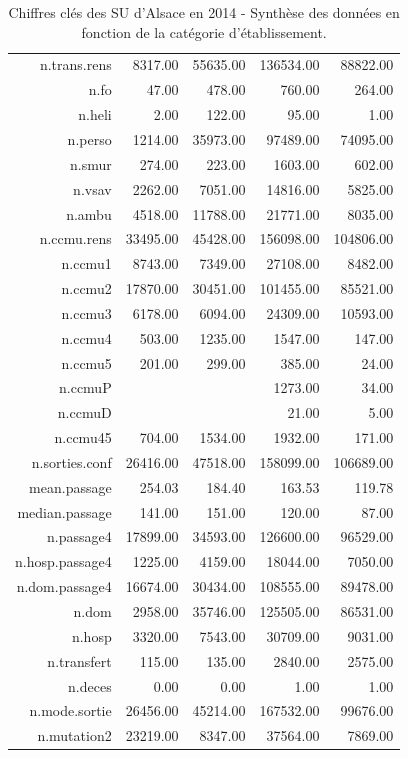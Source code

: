 \documentclass[]{article}
\begin{document}
\begin{table}[ht]
\begin{tabular}{rrrrr}
  n.trans.rens & 8317.00 & 55635.00 & 136534.00 & 88822.00 \\ 
  n.fo & 47.00 & 478.00 & 760.00 & 264.00 \\ 
  n.heli & 2.00 & 122.00 & 95.00 & 1.00 \\ 
  n.perso & 1214.00 & 35973.00 & 97489.00 & 74095.00 \\ 
  n.smur & 274.00 & 223.00 & 1603.00 & 602.00 \\ 
  n.vsav & 2262.00 & 7051.00 & 14816.00 & 5825.00 \\ 
  n.ambu & 4518.00 & 11788.00 & 21771.00 & 8035.00 \\ 
  n.ccmu.rens & 33495.00 & 45428.00 & 156098.00 & 104806.00 \\ 
  n.ccmu1 & 8743.00 & 7349.00 & 27108.00 & 8482.00 \\ 
  n.ccmu2 & 17870.00 & 30451.00 & 101455.00 & 85521.00 \\ 
  n.ccmu3 & 6178.00 & 6094.00 & 24309.00 & 10593.00 \\ 
  n.ccmu4 & 503.00 & 1235.00 & 1547.00 & 147.00 \\ 
  n.ccmu5 & 201.00 & 299.00 & 385.00 & 24.00 \\ 
  n.ccmuP &  &  & 1273.00 & 34.00 \\ 
  n.ccmuD &  &  & 21.00 & 5.00 \\ 
  n.ccmu45 & 704.00 & 1534.00 & 1932.00 & 171.00 \\ 
  n.sorties.conf & 26416.00 & 47518.00 & 158099.00 & 106689.00 \\ 
  mean.passage & 254.03 & 184.40 & 163.53 & 119.78 \\ 
  median.passage & 141.00 & 151.00 & 120.00 & 87.00 \\ 
  n.passage4 & 17899.00 & 34593.00 & 126600.00 & 96529.00 \\ 
  n.hosp.passage4 & 1225.00 & 4159.00 & 18044.00 & 7050.00 \\ 
  n.dom.passage4 & 16674.00 & 30434.00 & 108555.00 & 89478.00 \\ 
  n.dom & 2958.00 & 35746.00 & 125505.00 & 86531.00 \\ 
  n.hosp & 3320.00 & 7543.00 & 30709.00 & 9031.00 \\ 
  n.transfert & 115.00 & 135.00 & 2840.00 & 2575.00 \\ 
  n.deces & 0.00 & 0.00 & 1.00 & 1.00 \\ 
  n.mode.sortie & 26456.00 & 45214.00 & 167532.00 & 99676.00 \\ 
  n.mutation2 & 23219.00 & 8347.00 & 37564.00 & 7869.00 \\ 
   \hline
\end{tabular}
\caption{Chiffres clés des SU d'Alsace en 2014 - Synthèse des données en fonction de la catégorie d'établissement.} 
\end{table}
\end{document}
